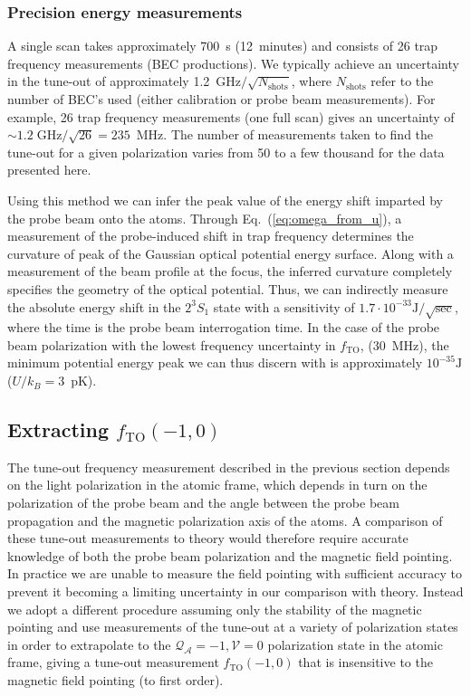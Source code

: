 \documentclass[%
 amsmath,amssymb,
aps,
]{revtex4-2}
\newcommand{\MetastableState}{2^{3\!}S_1}%
\begin{document}
\subsubsection{Precision energy measurements}

A single scan takes approximately 700~s (12~minutes) and consists of 26 trap frequency measurements (BEC productions). We typically achieve an uncertainty in the tune-out of approximately 1.2~$\text{GHz}/\sqrt{N_\text{shots}}$, where \(N_\text{shots}\) refer to the number of BEC's used (either calibration or probe beam measurements). For example, 26 trap frequency measurements (one full scan) gives an uncertainty of $\sim 1.2\;\mathrm{GHz}/\sqrt{26}=235$~MHz. The number of measurements taken to find the tune-out for a given polarization varies from 50 to a few thousand for the data presented here.

Using this method we can infer the peak value of the energy shift imparted by the probe beam onto the atoms. Through Eq.~(\ref{eq:omega_from_u}), a measurement of the probe-induced shift in trap frequency determines the curvature of peak of the Gaussian optical potential energy surface. Along with a measurement of the beam profile at the focus, the inferred curvature completely specifies the geometry of the optical potential. Thus, we can indirectly measure the absolute energy shift in the $\MetastableState$ state with a sensitivity of $1.7\cdot10^{-33}\mathrm{J}/\sqrt{\mathrm{sec}}$, where the time is the probe beam interrogation time. In the case of the probe beam polarization with the lowest frequency uncertainty in $f_\textrm{TO}$, (30~MHz), the minimum potential energy peak we can thus discern with is approximately $10^{-35}\mathrm{J}$ ($U/k_B=3$~pK).


\subsection{Extracting \(f_{\mathrm{TO}}(-1,0)\)}

 The tune-out frequency measurement described in the previous section depends on the light polarization in the atomic frame, which depends in turn on the polarization of the probe beam and the angle between the probe beam propagation and the magnetic polarization axis of the atoms. A comparison of these tune-out measurements to theory would therefore require accurate knowledge of both the probe beam polarization and the magnetic field pointing. In practice we are unable to measure the field pointing with sufficient accuracy to prevent it becoming a limiting uncertainty in our comparison with theory.
 Instead we adopt a different procedure assuming only the stability of the magnetic pointing and use measurements of the tune-out at a variety of polarization states in order to extrapolate to the \(\mathcal{Q_{A}}=-1,\mathcal{V}=0\) polarization state in the atomic frame, giving a tune-out measurement \(f_{\mathrm{TO}}(-1,0)\) that is insensitive to the magnetic field pointing (to first order). 
 
\end{document}
